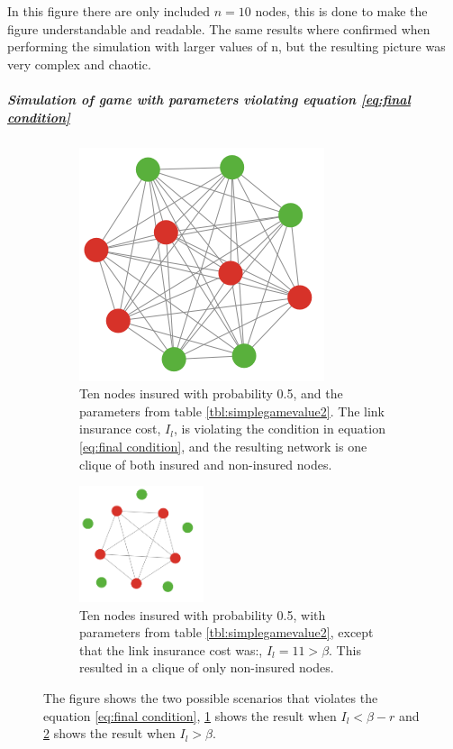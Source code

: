 In this figure there are only included $n=10$ nodes, this is done to make the figure understandable and readable.
The same results where confirmed when performing the simulation with larger values of n, but the resulting picture was very complex and chaotic.
\subparagraph{Simulation of game with parameters violating equation \ref{eq:final condition}}
\begin{figure}[h]
\centering
\begin{subfigure}{.5\textwidth}
  \centering
\includegraphics[width=0.4\linewidth]{../Figures/FirstSimulationViolatingResult.png}

\caption{\label{fig:SimulationViolatingA} Ten nodes insured with probability 0.5, and the parameters from table \ref{tbl:simplegamevalue2}. The link insurance cost, $I_{l}$, is violating the condition in equation \ref{eq:final condition}, and the resulting network is one clique of both insured and non-insured nodes.}
\end{subfigure}
\quad
\begin{subfigure}{0.46\textwidth}
\centering
\includegraphics[width=0.4\textwidth]{../Figures/SimulationViolating2.png}

\caption{\label{fig:SimulationViolatingB} Ten nodes insured with probability 0.5, with parameters from table \ref{tbl:simplegamevalue2}, except that the link insurance cost was:, $I_{l}=11>\beta$. This resulted in a clique of only non-insured nodes. }
\end{subfigure}
\caption{\label{fig:SimulationViolating} The figure shows the two possible scenarios that violates the equation \ref{eq:final condition}, \ref{fig:SimulationViolatingA} shows the result when $I_{l}<\beta-r$ and \ref{fig:SimulationViolatingB} shows the result when $I_{l}>\beta$.}
\end{figure}

